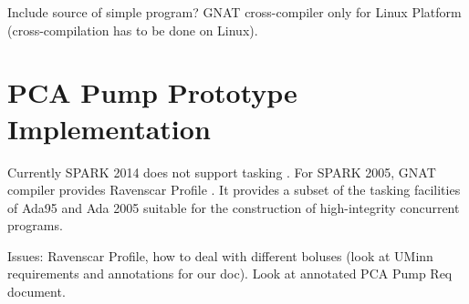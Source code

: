 Include source of simple program?
GNAT cross-compiler only for Linux Platform (cross-compilation has to be done on Linux).


\section{PCA Pump Prototype Implementation}
\label{pcapump:implementation}

Currently SPARK 2014 does not support tasking \cite{Spark2014refManual:Online}. For SPARK 2005, GNAT compiler provides Ravenscar Profile \cite{Ravenscar:Online}. It provides a subset of the tasking facilities of Ada95 and Ada 2005 suitable for the construction of high-integrity concurrent programs.

Issues: Ravenscar Profile, how to deal with different boluses (look at UMinn requirements and annotations for our doc).
Look at annotated PCA Pump Req document.